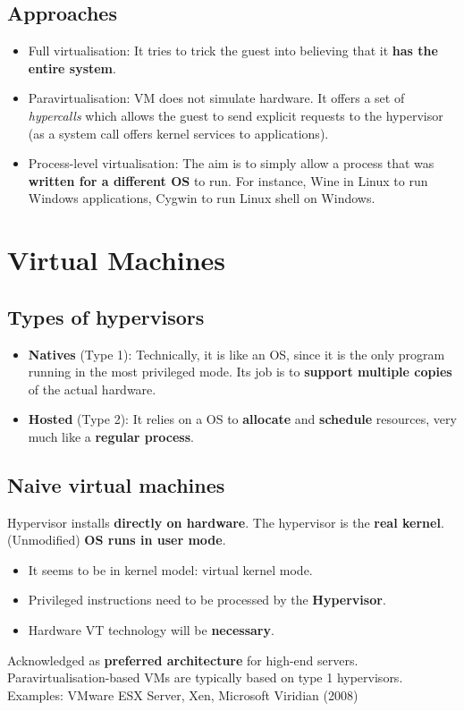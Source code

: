 \documentclass{article}
\begin{document}
\subsection{Approaches}
\begin{itemize}
	\item Full virtualisation: It tries to trick the guest into believing that it \textbf{has the entire system}. 
	\item Paravirtualisation: VM does not simulate hardware. It offers a set of \textit{hypercalls} which allows the guest to send explicit requests to the hypervisor (as a system call offers kernel services to applications).
	\item Process-level virtualisation: The aim is to simply allow a process that was \textbf{written for a different OS} to run. For instance, Wine in Linux to run Windows applications, Cygwin to run Linux shell on Windows.
\end{itemize}

\section{Virtual Machines}
\subsection{Types of hypervisors}
\begin{itemize}
	\item \textbf{Natives} (Type 1): Technically, it is like an OS, since it is the only program running in the most privileged mode. Its job is to \textbf{support multiple copies} of the actual hardware.
	\item \textbf{Hosted} (Type 2): It relies on a OS to \textbf{allocate} and \textbf{schedule} resources, very much like a \textbf{regular process}.
\end{itemize}

\subsection{Naive virtual machines}
\begin{flushleft}
Hypervisor installs \textbf{directly on hardware}. The hypervisor is the \textbf{real kernel}. (Unmodified) \textbf{OS runs in user mode}.
\begin{itemize}
	\item It seems to be in kernel model: virtual kernel mode.
	\item Privileged instructions need to be processed by the \textbf{Hypervisor}.
	\item Hardware VT technology will be \textbf{necessary}.
\end{itemize}
Acknowledged as \textbf{preferred architecture} for high-end servers. Paravirtualisation-based VMs are typically based on type 1 hypervisors.\\
Examples: VMware ESX Server, Xen, Microsoft Viridian (2008)
\end{flushleft}
\end{document}
